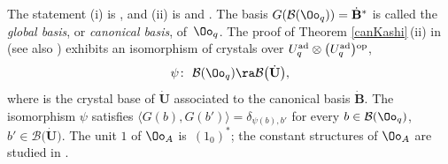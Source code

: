 The statement (i) is \cite[Theorem~1]{Kashiwara2}, and (ii) is \cite[Theorem 10.1 and Proposition 10.2.2]{Kashiwara3} and \cite[Section~29.5]{Lusztig}. The basis $G(\mathcal{B}(\Oo_q))=\dot{\mathbf{B}} {}^*$ is called the {\it global basis}, or {\it canonical basis}, of~$\Oo_q$. The proof of Theorem \ref{canKashi}\,(ii) in \cite{Kashiwara3} (see also \cite{Kashiwara4}) exhibits an isomorphism of crystals over $U_q^{\rm ad} \otimes \big(U_q^{\rm ad}\big){}^{\rm op}$,
\begin{equation}\label{isocrystal}
\psi\colon\ \mathcal{B}(\Oo_q) \ra \mathcal{B}\bigl(\dot{\mathbf{U}}\bigr),
\end{equation}
where  is the crystal base of $\dot{\mathbf{U}}$ associated to the canonical basis $\dot{\mathbf{B}}$. The isomorphism $\psi$ satisfies $\langle G(b),G(b')\rangle =\delta_{\psi(b),b'}$ for every $b\in \mathcal{B}(\Oo_q)$, $b'\in \mathcal{B}\bigl(\dot{\mathbf{U}}\bigr)$. The unit $1$ of $\Oo_A$ is~$(1_0)^*$; the constant structures of $\Oo_A$ are studied in \cite{Lusztig,Lusztig3}.

